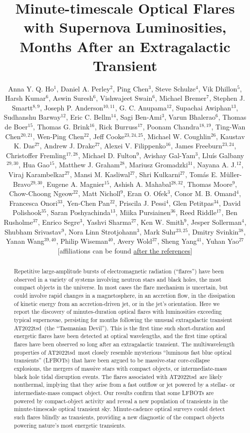 \documentclass{nature_plusfigure}
\title{Minute-timescale Optical Flares with Supernova Luminosities, Months After an Extragalactic Transient}
\author{Anna Y. Q. Ho$^{1}$, Daniel A. Perley$^{2}$, Ping Chen$^{3}$, Steve Schulze$^{4}$, Vik Dhillon$^{5}$, Harsh Kumar$^{6}$, Aswin Suresh$^{6}$, Vishwajeet Swain$^{6}$, Michael Bremer$^{7}$, Stephen J. Smartt$^{8,9}$, Joseph P. Anderson$^{10,11}$, G. C. Anupama$^{12}$, Supachai Awiphan$^{13}$, Sudhanshu Barway$^{12}$, Eric C. Bellm$^{14}$, Sagi Ben-Ami$^{3}$, Varun Bhalerao$^{6}$, Thomas de Boer$^{15}$, Thomas G. Brink$^{16}$, Rick Burruss$^{17}$, Poonam Chandra$^{18,19}$, Ting-Wan Chen$^{20,21}$, Wen-Ping Chen$^{22}$, Jeff Cooke$^{23,24,25}$, Michael W. Coughlin$^{26}$, Kaustav K. Das$^{27}$, Andrew J. Drake$^{27}$, Alexei V. Filippenko$^{16}$, James Freeburn$^{23,24}$, Christoffer Fremling$^{17,28}$, Michael D. Fulton$^{9}$, Avishay Gal-Yam$^{3}$, Llu\'is Galbany$^{29,30}$, Hua Gao$^{15}$, Matthew J. Graham$^{28}$, Mariusz Gromadzki$^{31}$, Nayana A. J.$^{12}$, Viraj Karambelkar$^{27}$, Mansi M. Kasliwal$^{27}$, Shri Kulkarni$^{27}$, Tom\'as E. M\"uller-Bravo$^{29,30}$, Eugene A. Magnier$^{15}$, Ashish A. Mahabal$^{28,32}$, Thomas Moore$^{9}$, Chow-Choong Ngeow$^{22}$, Matt Nicholl$^{9}$, Eran O. Ofek$^{3}$, Conor M. B. Omand$^{4}$, Francesca Onori$^{33}$, Yen-Chen Pan$^{22}$, Priscila J. Pessi$^{4}$, Glen Petitpas$^{34}$, David Polishook$^{35}$, Saran Poshyachinda$^{13}$, Miika Pursiainen$^{36}$, Reed Riddle$^{17}$, Ben Rusholme$^{37}$, Enrico Segre$^{3}$, Yashvi Sharma$^{27}$, Ken W. Smith$^{9}$, Jesper Sollerman$^{4}$, Shubham Srivastav$^{9}$, Nora Linn Strotjohann$^{3}$, Mark Suhr$^{23,25}$, Dmitry Svinkin$^{38}$, Yanan Wang$^{39,40}$, Philip Wiseman$^{40}$, Avery Wold$^{37}$, Sheng Yang$^{41}$, Yuhan Yao$^{27}$
[affiliations can be found \hyperref[sec:affiliations]{after the references}]
	}
\newcommand{\at}{AT2022tsd}
\begin{document}
\maketitle

\begin{abstract}

Repetitive large-amplitude bursts of electromagnetic radiation (``flares'') have been observed in a variety of systems involving neutron stars and black holes\cite{Fender1997,Hurley1999,Marrone2008,Racusin2008,Kasliwal2008,CastroTirado2008,Stefanescu2008,Nesci2021}, the most compact objects in the universe. In most cases the flare mechanism is uncertain, but could involve rapid changes in a magnetosphere\cite{Hurley1999,CastroTirado2008,Stefanescu2008}, in an accretion flow\cite{Fender2004,Yuan2014}, in the dissipation of kinetic energy from an accretion-driven jet\cite{Racusin2008}, or in the jet's orientation\cite{Raiteri2017}.
Here we report the discovery of minutes-duration optical flares with luminosities exceeding typical supernovae, persisting for months following the unusual extragalactic transient \at\ (the ``Tasmanian Devil'').
This is the first time such short-duration and energetic flares have been detected at optical wavelengths, and the first time optical flares have been observed so long after an extragalactic transient.
The multiwavelength properties of \at\ most closely resemble mysterious ``luminous fast blue optical transients'' (LFBOTs\cite{Prentice2018,RiveraSandoval2018,Perley2019,Margutti2019,Ho2019,Coppejans2020,Ho2020_Koala,Perley2021,Bright2022,Ho2022_AT2020xnd,Yao2022}) that have been argued to be massive-star core-collapse explosions\cite{Prentice2018,Margutti2019,Perley2019}, the mergers of massive stars with compact objects\cite{Metzger2022}, or intermediate-mass black hole tidal disruption events\cite{Kuin2019,Perley2019}. The flares associated with \at\ are likely nonthermal, implying that they arise from a fast outflow or jet powered by a stellar- or intermediate-mass compact object.
Our results confirm that some LFBOTs are powered by compact-object activity
and reveal a new population of transients in the minute-timescale optical transient sky.
Minute-cadence optical surveys\cite{Ofek2023,Law2022} could detect such flares blindly as transients,
providing a new diagnostic of the compact objects powering nature's most energetic transients.

\end{abstract}
\end{document}
